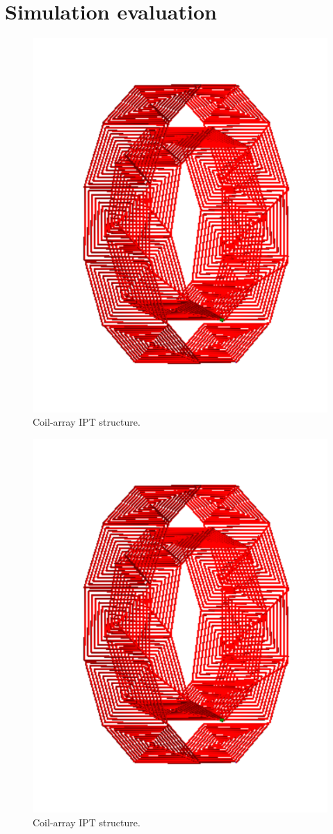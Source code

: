 
\section{Simulation evaluation}

\begin{figure}[htbp]
    \centering
    \includegraphics[width=0.5\linewidth]{images/4_coil_array_system.png}
    \caption{Coil-array IPT structure.}
\end{figure}

\begin{figure}[htbp]
    \centering
    \includegraphics[width=0.5\linewidth]{images/4_coil_array_system.png}
    \caption{Coil-array IPT structure.}
\end{figure}

